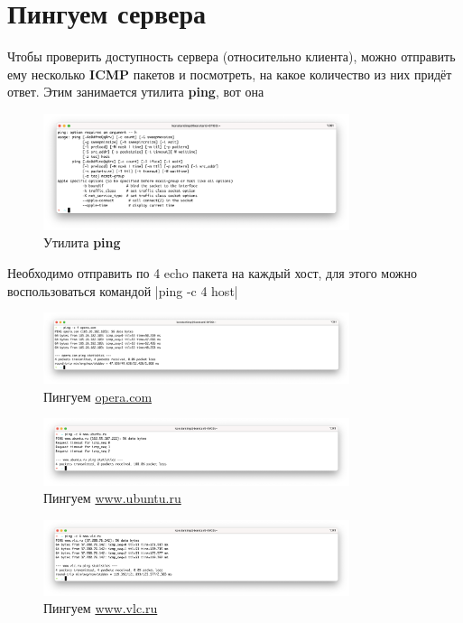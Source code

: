 \documentclass[a4paper]{article}
\begin{document}
  \newpage
  \section{Пингуем сервера}

  Чтобы проверить доступность сервера (относительно клиента), можно отправить ему несколько \textbf{ICMP} пакетов и посмотреть,
  на какое количество из них придёт ответ. Этим занимается утилита \textbf{ping}, вот она
  \begin{figure}[H]
    \centering
    \includegraphics[width=0.8\textwidth]{s23}
    \caption{Утилита \textbf{ping}}
  \end{figure}

  Необходимо отправить по 4 echo пакета на каждый хост, для этого можно воспользоваться командой
  |ping -c 4 host|
  
  \begin{figure}[H]
    \centering
    \includegraphics[width=0.8\textwidth]{s24}
    \caption{Пингуем \href{opera.com}{opera.com}}
  \end{figure}
  \begin{figure}[H]
    \centering
    \includegraphics[width=0.8\textwidth]{s25}
    \caption{Пингуем \href{www.ubuntu.ru}{www.ubuntu.ru}}
  \end{figure}
  \begin{figure}[H]
    \centering
    \includegraphics[width=0.8\textwidth]{s26}
    \caption{Пингуем \href{www.vlc.ru}{www.vlc.ru}}
  \end{figure}
\end{document}
